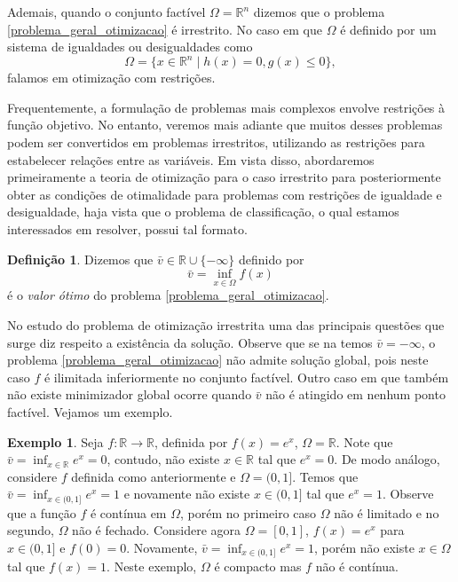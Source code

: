 \documentclass[12pt,a4paper]{scrartcl}
\def\RR{\mathds{R}}
\theoremstyle{definition}%
\newtheorem{exem}{Exemplo}
\newtheorem{defi}{Definição}
\begin{document}


Ademais, quando o conjunto factível $\Omega = \RR^{n}$ dizemos que o problema \eqref{problema_geral_otimizacao} é irrestrito. No caso em que $\Omega$ é definido por um sistema de igualdades ou desigualdades como
\[
\Omega = \{ x\in \RR^{n} \mid h(x)=0, g(x) \leq 0 \},
\]
falamos em otimização com restrições.

Frequentemente, a formulação de problemas mais complexos envolve restrições à função objetivo. No entanto, veremos mais adiante que muitos desses problemas podem ser convertidos em problemas irrestritos, utilizando as restrições para estabelecer relações entre as variáveis. Em vista disso, abordaremos primeiramente a teoria de otimização para o caso irrestrito para posteriormente obter as condições de otimalidade para problemas com restrições de igualdade e desigualdade, haja vista que o problema de classificação, o qual estamos interessados em resolver, possui tal formato.

\begin{defi} \label{defi:valor_otimo}
Dizemos que $\bar{v} \in \RR \cup \{ -\infty \}$ definido por
\[
\bar{v} = \inf_{x \in \Omega} f(x)
\]
é o \emph{valor ótimo} do problema \eqref{problema_geral_otimizacao}.
\end{defi}

No estudo do problema de otimização irrestrita uma das principais questões que surge diz respeito a existência da solução. Observe que se na  temos $\bar{v} = - \infty$, o problema \eqref{problema_geral_otimizacao} não admite solução global, pois neste caso $f$ é ilimitada inferiormente no conjunto factível. Outro caso em que também não existe minimizador global ocorre quando $\bar{v}$ não é atingido em nenhum ponto factível. Vejamos um exemplo.

\begin{exem}
Seja $f: \RR \rightarrow \RR$, definida por $f(x) = e^{x}$, $\Omega = \RR$. Note que $\bar{v} = \inf_{x \in \RR} e^{x} = 0$, contudo, não existe $x \in \RR$ tal que $e^{x} = 0$. 
De modo análogo, considere $f$ definida como anteriormente e $\Omega = (0,1]$. Temos que $\bar{v} = \inf_{x \in (0,1]} e^{x} = 1$ e novamente não existe $x \in (0,1]$ tal que $e^{x}=1$. Observe que a função $f$ é contínua em $\Omega$, porém no primeiro caso $\Omega$ não é limitado e no segundo, $\Omega$ não é fechado. 
Considere agora $\Omega = [0,1]$, $f(x)=e^{x}$ para $x \in (0,1]$ e $f(0)=0$. Novamente, $\bar{v} = \inf_{x \in (0,1]} e^{x} = 1$, porém não existe $x\in \Omega$ tal que $f(x)=1$. Neste exemplo, $\Omega$ é compacto mas $f$ não é contínua.
\end{exem}
\end{document}
